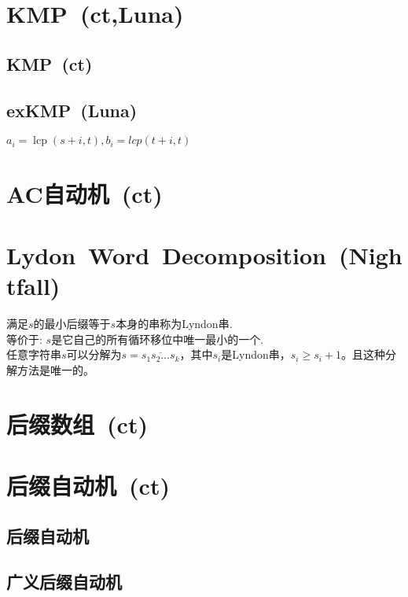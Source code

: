 \newcommand{\lcp}{\operatorname{lcp}}
\section{KMP~\small(ct,Luna)}
    \subsection*{KMP~\small(ct)}
    \subsection*{exKMP~\small(Luna)}
        $a_i = \lcp(s + i, t), b_i = lcp(t + i, t) $

\section{AC自动机~\small(ct)}

\section{Lydon~Word~Decomposition~\small(Nightfall)}
    满足$ s $的最小后缀等于$ s $本身的串称为Lyndon串.
    \\等价于: $ s $是它自己的所有循环移位中唯一最小的一个.
    \\任意字符串$ s $可以分解为$ s = \overline{s_1 s_2 \dots s_k} $，其中$ s_i $是Lyndon串，$ s_i \geq s_i + 1 $。且这种分解方法是唯一的。

\section{后缀数组~\small(ct)}

\section{后缀自动机~\small(ct)}
    \subsection*{后缀自动机}
    \subsection*{广义后缀自动机}

